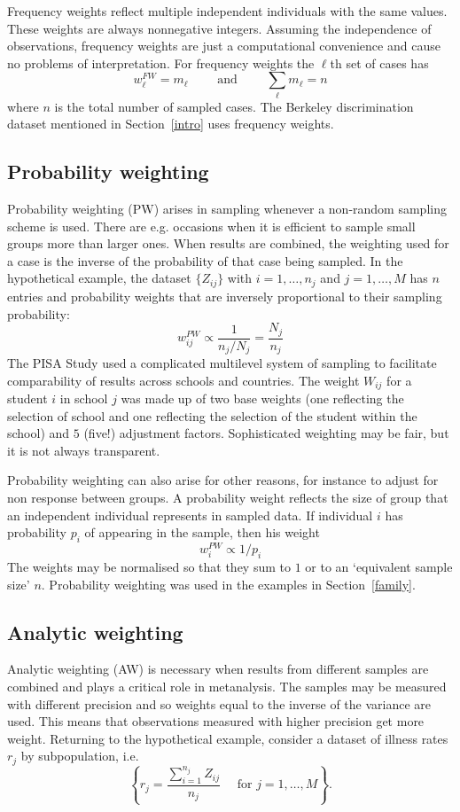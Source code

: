 \documentclass{svmult}
\begin{document}
Frequency  weights reflect multiple independent individuals with the same values.  These weights are always nonnegative integers.  Assuming the independence of observations, frequency weights are just a computational convenience and cause no problems of interpretation.  For frequency weights the $\ell$th set of cases has
$$w_\ell^{FW}=m_\ell \qquad \mbox{ and }\qquad \sum_\ell m_\ell = n$$
where $n$ is the total number of sampled cases.  The Berkeley discrimination dataset mentioned in Section~\ref{intro} uses frequency weights.

\subsection{Probability weighting}
\label{pw}
Probability weighting (PW) arises in sampling whenever a non-random sampling scheme is used.   There are e.g. occasions when it is efficient to sample small groups more than larger ones.  When results are combined, the weighting used for a case is the inverse of the probability of that case being sampled.  In the hypothetical example, the dataset $\{Z_{ij}\}$ with $i=1,\dots,n_j$ and $ j=1,\dots,M$ has $n$ entries and probability weights that are inversely proportional to their sampling probability:
$$w_{ij}^{PW} \propto \frac{1}{n_j/N_j}=\frac{N_j}{n_j}$$
The PISA Study \citep{adams:2002}  used a complicated multilevel system of sampling to facilitate comparability of results across schools and countries.  The weight $W_{ij}$ for a student $i$ in school $j$ was made up of two base weights (one reflecting the selection of school and one reflecting the selection of the student within the school) and $5$ (five!) adjustment factors.  Sophisticated weighting may be fair, but it is not always transparent.
\par
Probability weighting can also arise for other reasons, for instance to adjust for non response between groups.  A probability weight reflects the size of group that an independent individual represents in sampled data.  If individual $i$ has probability $p_i$ of appearing in the sample, then his weight
$$w_i^{PW} \propto 1/p_i$$
The weights may be normalised so that they sum to $1$ or to an `equivalent sample size' $n$.  Probability weighting was used in the examples in Section~\ref{family}.

\subsection{Analytic weighting}
\label{aw}
Analytic weighting (AW) is necessary when results from different samples are combined and plays a critical role in metanalysis.  The samples may be measured with different precision and so weights equal to the inverse of the variance are used.  This means that observations measured with higher precision get more weight.
Returning to the hypothetical example, consider a dataset of illness rates $r_j$ by subpopulation, i.e. 
$$\left\{r_j=\frac{\sum_{i=1}^{n_j}Z_{ij}}{n_j}\quad \text{ for }j=1,\dots,M\right\}.$$
\end{document}
